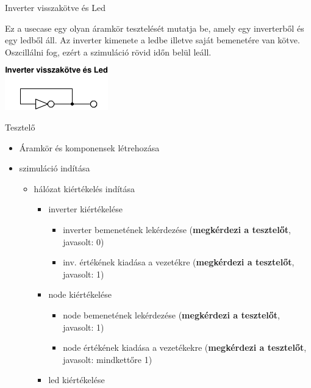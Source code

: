 \usecase
{Inverter visszakötve és Led}
{Ez a usecase egy olyan áramkör tesztelését mutatja be, amely egy inverterből és egy ledből áll. Az inverter kimenete a ledbe illetve saját bemenetére van kötve. Oszcillálni fog, ezért a szimuláció rövid időn belül leáll.
\newline
\begin{center}
\vspace{-15pt}
\includegraphics[scale=1.5]{dw/circuit_test4.pdf}
\vspace{-10pt}
\end{center}}
{Tesztelő}
{\vspace{-10pt}
\begin{itemize}
\setlength{\itemsep}{0cm}%
\setlength{\parskip}{0cm}%
\setlength{\itemindent}{-15pt}%
\item Áramkör és komponensek létrehozása
\item szimuláció indítása
\begin{itemize}
\setlength{\itemsep}{0cm}%
\setlength{\parskip}{0cm}%
\setlength{\itemindent}{-35pt}%
\item hálózat kiértékelés indítása
\begin{itemize}
\setlength{\itemsep}{0cm}%
\setlength{\parskip}{0cm}%
\setlength{\itemindent}{-50pt}%
	\item inverter kiértékelése
	\begin{itemize}
	\setlength{\itemsep}{0cm}%
	\setlength{\parskip}{0cm}%
	\setlength{\itemindent}{-65pt}%
		\item inverter bemenetének lekérdezése (\textbf{megkérdezi a tesztelőt}, javasolt: 0)
		\item inv. értékének kiadása a vezetékre (\textbf{megkérdezi a tesztelőt}, javasolt: 1)
	\end{itemize}
	\item node kiértékelése
	\begin{itemize}
	\setlength{\itemsep}{0cm}%
	\setlength{\parskip}{0cm}%
	\setlength{\itemindent}{-65pt}%
		\item node bemenetének lekérdezése (\textbf{megkérdezi a tesztelőt}, javasolt: 1)
		\item node értékének kiadása a vezetékekre (\textbf{megkérdezi a tesztelőt}, javasolt: mindkettőre 1)
	\end{itemize}
	\item led kiértékelése

\end{itemize}
\end{itemize}
\end{itemize}}
